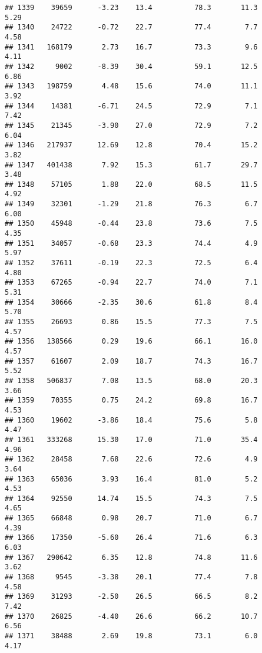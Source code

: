 \documentclass[
]{article}
\begin{document}
\begin{verbatim}
## 1339    39659      -3.23    13.4          78.3       11.3              5.29
## 1340    24722      -0.72    22.7          77.4        7.7              4.58
## 1341   168179       2.73    16.7          73.3        9.6              4.11
## 1342     9002      -8.39    30.4          59.1       12.5              6.86
## 1343   198759       4.48    15.6          74.0       11.1              3.92
## 1344    14381      -6.71    24.5          72.9        7.1              7.42
## 1345    21345      -3.90    27.0          72.9        7.2              6.04
## 1346   217937      12.69    12.8          70.4       15.2              3.82
## 1347   401438       7.92    15.3          61.7       29.7              3.48
## 1348    57105       1.88    22.0          68.5       11.5              4.92
## 1349    32301      -1.29    21.8          76.3        6.7              6.00
## 1350    45948      -0.44    23.8          73.6        7.5              4.35
## 1351    34057      -0.68    23.3          74.4        4.9              5.97
## 1352    37611      -0.19    22.3          72.5        6.4              4.80
## 1353    67265      -0.94    22.7          74.0        7.1              5.31
## 1354    30666      -2.35    30.6          61.8        8.4              5.70
## 1355    26693       0.86    15.5          77.3        7.5              4.57
## 1356   138566       0.29    19.6          66.1       16.0              4.57
## 1357    61607       2.09    18.7          74.3       16.7              5.52
## 1358   506837       7.08    13.5          68.0       20.3              3.66
## 1359    70355       0.75    24.2          69.8       16.7              4.53
## 1360    19602      -3.86    18.4          75.6        5.8              4.47
## 1361   333268      15.30    17.0          71.0       35.4              4.96
## 1362    28458       7.68    22.6          72.6        4.9              3.64
## 1363    65036       3.93    16.4          81.0        5.2              4.53
## 1364    92550      14.74    15.5          74.3        7.5              4.65
## 1365    66848       0.98    20.7          71.0        6.7              4.39
## 1366    17350      -5.60    26.4          71.6        6.3              6.03
## 1367   290642       6.35    12.8          74.8       11.6              3.62
## 1368     9545      -3.38    20.1          77.4        7.8              4.58
## 1369    31293      -2.50    26.5          66.5        8.2              7.42
## 1370    26825      -4.40    26.6          66.2       10.7              6.56
## 1371    38488       2.69    19.8          73.1        6.0              4.17

\end{verbatim}
\end{document}

